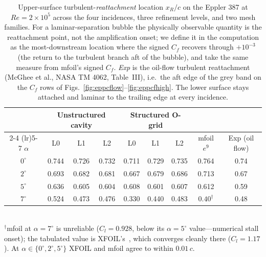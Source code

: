 \documentclass[journal]{new-aiaa}
\begin{document}
\begin{table}[tp]
  \centering
  \caption{Upper-surface turbulent-\emph{reattachment} location $x_R/c$ on the
  Eppler 387 at $Re\!=\!2\!\times\!10^5$ across the four incidences, three
  refinement levels, and two mesh families. For a laminar-separation bubble the
  physically observable quantity is the reattachment point, not the amplification
  onset; we define it in the computation as the most-downstream location where the
  signed $C_f$ recovers through $+10^{-3}$ (the return to the turbulent branch aft
  of the bubble), and take the same measure from mfoil's signed $C_f$. \emph{Exp}
  is the oil-flow turbulent reattachment (McGhee et al., NASA TM 4062, Table~III),
  i.e.\ the aft edge of the grey band on the $C_f$ rows of
  Figs.~\ref{fig:eppcflow}--\ref{fig:eppcfhigh}. The lower surface stays attached
  and laminar to the trailing edge at every incidence.}
  \label{tab:eppxtr}
  \begin{tabular}{ccccccccc}
    \toprule
    & \multicolumn{3}{c}{Unstructured cavity} & \multicolumn{3}{c}{Structured O-grid} & & \\
    \cmidrule(lr){2-4} \cmidrule(lr){5-7}
    $\alpha$ & L0 & L1 & L2 & L0 & L1 & L2 & mfoil $e^9$ & Exp (oil flow) \\
    \midrule
    $0^\circ$ & 0.744 & 0.726 & 0.732 & 0.711 & 0.729 & 0.735 & 0.764 & 0.74 \\
    $2^\circ$ & 0.693 & 0.682 & 0.681 & 0.667 & 0.679 & 0.686 & 0.713 & 0.67 \\
    $5^\circ$ & 0.636 & 0.605 & 0.604 & 0.608 & 0.601 & 0.607 & 0.612 & 0.59 \\
    $7^\circ$ & 0.524 & 0.473 & 0.476 & 0.330 & 0.440 & 0.483 & $0.40^\dagger$ & 0.48 \\
    \bottomrule
  \end{tabular}
  \\[2pt]{\footnotesize $^\dagger$mfoil at $\alpha\!=\!7^\circ$ is unreliable
  ($C_l\!=\!0.928$, below its $\alpha\!=\!5^\circ$ value---numerical stall onset);
  the tabulated value is XFOIL's~\cite{drela_xfoil_1989}, which converges cleanly
  there ($C_l\!=\!1.17$). At $\alpha\!\in\!\{0^\circ,2^\circ,5^\circ\}$ XFOIL and
  mfoil agree to within $0.01\,c$.}
\end{table}
\end{document}
